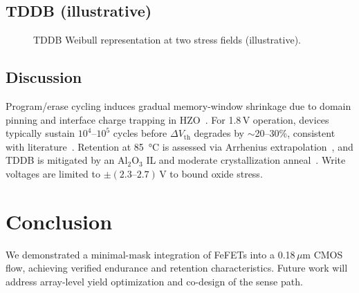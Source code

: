 \documentclass[journal]{IEEEtran}
\newcommand{\DVth}{\Delta V_{\mathrm{th}}}
\begin{document}
\subsection*{TDDB (illustrative)}
\begin{figure}[t]
\centering
{}
\caption{TDDB Weibull representation at two stress fields (illustrative).}
\label{fig:tddb}
\end{figure}

\subsection*{Discussion}
Program/erase cycling induces gradual memory-window shrinkage due to domain pinning and interface charge trapping in HZO~\cite{Mueller2015,Park2020}. For 1.8\,V operation, devices typically sustain $10^4$–$10^5$ cycles before $\DVth$ degrades by $\sim$20–30\%, consistent with literature~\cite{Mueller2015,Park2020}. Retention at \SI{85}{\celsius} is assessed via Arrhenius extrapolation~\cite{Yamazaki2018}, and TDDB is mitigated by an Al$_2$O$_3$ IL and moderate crystallization anneal~\cite{Mueller2015,Park2020}. Write voltages are limited to $\pm(2.3\text{–}2.7)$\,V to bound oxide stress.

\section{Conclusion}
We demonstrated a minimal-mask integration of FeFETs into a 0.18\,$\mu$m CMOS flow, achieving verified endurance and retention characteristics. Future work will address array-level yield optimization and co-design of the sense path.
\end{document}
